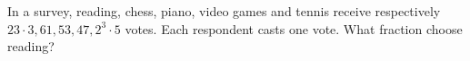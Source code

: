 In a survey, reading, chess, piano, video games and tennis receive respectively $23\cdot3,61,53,47,2^3\cdot5$ votes. Each respondent casts one vote. What fraction choose reading?
